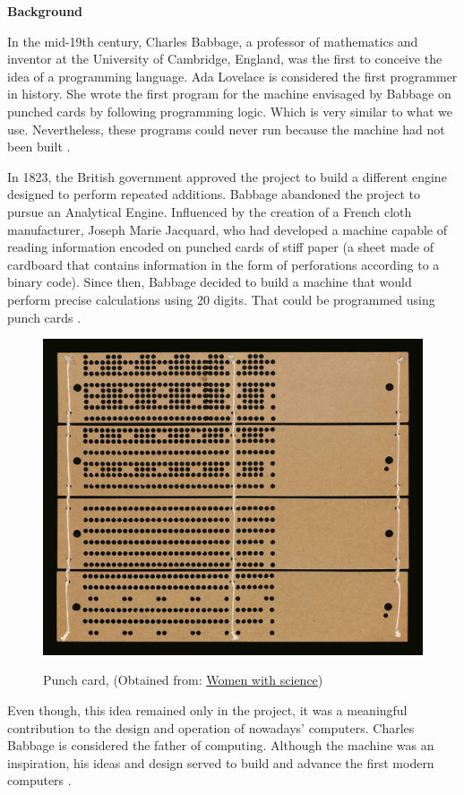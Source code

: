 \documentclass[11pt, letterpaper, english]{article}
\begin{document}
\textbf{Background}

\par{In the mid-19th century, Charles Babbage, a professor of mathematics and inventor at the University of Cambridge, England, was the first to conceive the idea of a programming language. Ada Lovelace is considered the first programmer in history. She wrote the first program for the machine envisaged by Babbage on punched cards by following programming logic. Which is very similar to what we use. Nevertheless, these programs could never run because the machine had not been built  \cite{garfinkel_shevtsov_guo_2017}.} 
\vspace{0.5 cm}
	
	
\par{In 1823, the  British government approved the project to build a different engine designed to perform repeated additions. Babbage abandoned the project to pursue an Analytical Engine. Influenced by the creation of a French cloth manufacturer, Joseph Marie Jacquard, who had developed a machine capable of reading information encoded on punched cards of stiff paper (a sheet made of cardboard that contains information in the form of perforations according to a binary code). Since then, Babbage decided to build a machine that would perform precise calculations using 20 digits. That could be programmed using punch cards  \cite{garfinkel_shevtsov_guo_2017}.} 

\begin{figure}
	    \centering
		\caption{Punch card, (Obtained from: \href{https://mujeresconciencia.com/2018/06/27/tarjetas-para-programar-el-mundo/}{Women with science})}
		\includegraphics[width=0.5 \textwidth]{Tarjeta.jpg}
		\label{Fig-Perforada}
\end{figure}

\par{Even though, this idea remained only in the project, it was a meaningful contribution to the design and operation of nowadays' computers. Charles Babbage is considered the father of computing. Although the machine was an inspiration, his ideas and design served to build and advance the first modern computers  \cite{garfinkel_shevtsov_guo_2017}.}
\end{document}
